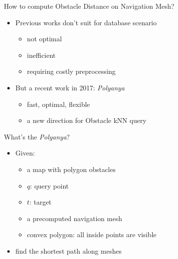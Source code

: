 \begin{frame}{How to compute Obstacle Distance on Navigation Mesh?}
\begin{itemize}
    \item Previous works don't suit for database scenario
    \begin{itemize}
        \item not optimal
        \item inefficient
        \item requiring costly preprocessing
    \end{itemize}
    \item \small But a recent work in 2017: \textit{Polyanya}
    \begin{itemize}
        \item fast, optimal, flexible
        \item a new direction for Obstacle kNN query
    \end{itemize}
    
\end{itemize}
\end{frame}

\begin{frame}{What's the \textit{Polyanya}?}

\begin{minipage}{.4\textwidth}
\begin{itemize}
    \item<1-> \small Given:
    \begin{itemize}
        \item \small a map with polygon obstacles
        \item \small $q$: query point
        \item \small $t$: target
        \item \small a precomputed navigation mesh
        \item \small convex polygon: all inside points are visible
    \end{itemize}
    \item \small find the shortest path along meshes
\end{itemize}

\end{minipage}%
\begin{minipage}{.6\textwidth}
\begin{adjustbox}{max totalsize={.9\textwidth}{.9\textheight}, right}
\end{adjustbox}
\end{minipage}
\end{frame}

